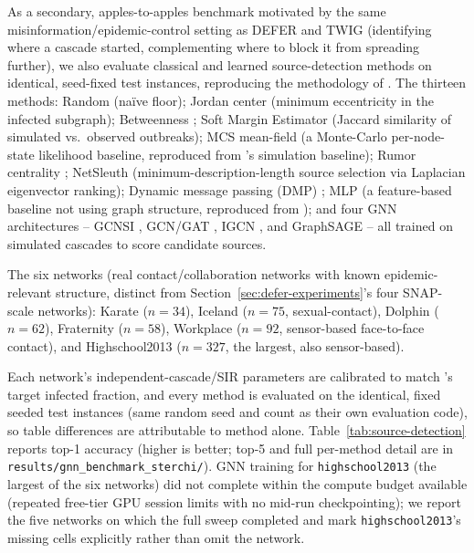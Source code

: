 \documentclass[ijoc,sglanonrev]{informs4}
\begin{document}
As a secondary, apples-to-apples benchmark motivated by the same
misinformation/epidemic-control setting as DEFER and TWIG (identifying
where a cascade started, complementing where to block it from spreading
further), we also evaluate classical and learned source-detection methods
on identical, seed-fixed test instances, reproducing the methodology of
\citet{sterchi2026}. The thirteen methods: Random (na\"ive floor); Jordan
center \citep{zhu2016} (minimum eccentricity in the infected subgraph);
Betweenness \citep{freeman1977}; Soft Margin Estimator
\citep{antulov2015} (Jaccard similarity of simulated vs.\ observed
outbreaks); MCS mean-field (a Monte-Carlo per-node-state likelihood
baseline, reproduced from \citet{sterchi2026}'s simulation baseline);
Rumor centrality \citep{shah2011}; NetSleuth \citep{prakash2012}
(minimum-description-length source selection via Laplacian eigenvector
ranking); Dynamic message passing (DMP) \citep{lokhov2014}; MLP (a
feature-based baseline not using graph structure, reproduced from
\citet{sterchi2026}); and four GNN architectures -- GCNSI
\citep{dong2019}, GCN/GAT \citep{shah2020}, IGCN \citep{guo2021}, and
GraphSAGE \citep{haddad2023} -- all trained on simulated cascades to
score candidate sources.

The six networks (real contact/collaboration networks with known
epidemic-relevant structure, distinct from Section~\ref{sec:defer-experiments}'s
four SNAP-scale networks): Karate \citep{zachary1977} ($n=34$), Iceland
\citep{haraldsdottir1992} ($n=75$, sexual-contact), Dolphin
\citep{lusseau2003} ($n=62$), Fraternity \citep{killworth1976} ($n=58$),
Workplace \citep{genois2015} ($n=92$, sensor-based face-to-face contact),
and Highschool2013 \citep{mastrandrea2015} ($n=327$, the largest, also
sensor-based).

Each network's independent-cascade/SIR parameters are calibrated
to match \citet{sterchi2026}'s target infected fraction, and every method
is evaluated on the identical, fixed seeded test instances (same random
seed and count as their own evaluation code), so table differences are
attributable to method alone. Table~\ref{tab:source-detection} reports
top-1 accuracy (higher is better; top-5 and full per-method detail are in
\texttt{results/gnn\_benchmark\_sterchi/}).
GNN training for \texttt{highschool2013} (the largest of the six networks)
did not complete within the compute budget available (repeated free-tier
GPU session limits with no mid-run checkpointing); we report the five
networks on which the full sweep completed and mark
\texttt{highschool2013}'s missing cells explicitly rather than omit the
network.
\end{document}
